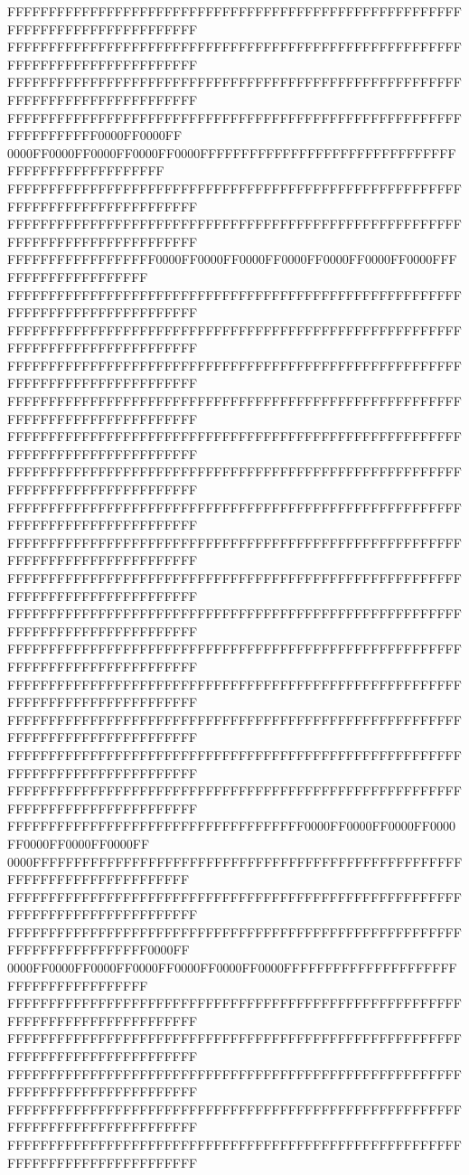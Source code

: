 FFFFFFFFFFFFFFFFFFFFFFFFFFFFFFFFFFFFFFFFFFFFFFFFFFFFFFFFFFFFFFFFFFFFFFFFFFFFFF
FFFFFFFFFFFFFFFFFFFFFFFFFFFFFFFFFFFFFFFFFFFFFFFFFFFFFFFFFFFFFFFFFFFFFFFFFFFFFF
FFFFFFFFFFFFFFFFFFFFFFFFFFFFFFFFFFFFFFFFFFFFFFFFFFFFFFFFFFFFFFFFFFFFFFFFFFFFFF
FFFFFFFFFFFFFFFFFFFFFFFFFFFFFFFFFFFFFFFFFFFFFFFFFFFFFFFFFFFFFFFFFF0000FF0000FF
0000FF0000FF0000FF0000FF0000FFFFFFFFFFFFFFFFFFFFFFFFFFFFFFFFFFFFFFFFFFFFFFFFFF
FFFFFFFFFFFFFFFFFFFFFFFFFFFFFFFFFFFFFFFFFFFFFFFFFFFFFFFFFFFFFFFFFFFFFFFFFFFFFF
FFFFFFFFFFFFFFFFFFFFFFFFFFFFFFFFFFFFFFFFFFFFFFFFFFFFFFFFFFFFFFFFFFFFFFFFFFFFFF
FFFFFFFFFFFFFFFFFF0000FF0000FF0000FF0000FF0000FF0000FF0000FFFFFFFFFFFFFFFFFFFF
FFFFFFFFFFFFFFFFFFFFFFFFFFFFFFFFFFFFFFFFFFFFFFFFFFFFFFFFFFFFFFFFFFFFFFFFFFFFFF
FFFFFFFFFFFFFFFFFFFFFFFFFFFFFFFFFFFFFFFFFFFFFFFFFFFFFFFFFFFFFFFFFFFFFFFFFFFFFF
FFFFFFFFFFFFFFFFFFFFFFFFFFFFFFFFFFFFFFFFFFFFFFFFFFFFFFFFFFFFFFFFFFFFFFFFFFFFFF
FFFFFFFFFFFFFFFFFFFFFFFFFFFFFFFFFFFFFFFFFFFFFFFFFFFFFFFFFFFFFFFFFFFFFFFFFFFFFF
FFFFFFFFFFFFFFFFFFFFFFFFFFFFFFFFFFFFFFFFFFFFFFFFFFFFFFFFFFFFFFFFFFFFFFFFFFFFFF
FFFFFFFFFFFFFFFFFFFFFFFFFFFFFFFFFFFFFFFFFFFFFFFFFFFFFFFFFFFFFFFFFFFFFFFFFFFFFF
FFFFFFFFFFFFFFFFFFFFFFFFFFFFFFFFFFFFFFFFFFFFFFFFFFFFFFFFFFFFFFFFFFFFFFFFFFFFFF
FFFFFFFFFFFFFFFFFFFFFFFFFFFFFFFFFFFFFFFFFFFFFFFFFFFFFFFFFFFFFFFFFFFFFFFFFFFFFF
FFFFFFFFFFFFFFFFFFFFFFFFFFFFFFFFFFFFFFFFFFFFFFFFFFFFFFFFFFFFFFFFFFFFFFFFFFFFFF
FFFFFFFFFFFFFFFFFFFFFFFFFFFFFFFFFFFFFFFFFFFFFFFFFFFFFFFFFFFFFFFFFFFFFFFFFFFFFF
FFFFFFFFFFFFFFFFFFFFFFFFFFFFFFFFFFFFFFFFFFFFFFFFFFFFFFFFFFFFFFFFFFFFFFFFFFFFFF
FFFFFFFFFFFFFFFFFFFFFFFFFFFFFFFFFFFFFFFFFFFFFFFFFFFFFFFFFFFFFFFFFFFFFFFFFFFFFF
FFFFFFFFFFFFFFFFFFFFFFFFFFFFFFFFFFFFFFFFFFFFFFFFFFFFFFFFFFFFFFFFFFFFFFFFFFFFFF
FFFFFFFFFFFFFFFFFFFFFFFFFFFFFFFFFFFFFFFFFFFFFFFFFFFFFFFFFFFFFFFFFFFFFFFFFFFFFF
FFFFFFFFFFFFFFFFFFFFFFFFFFFFFFFFFFFFFFFFFFFFFFFFFFFFFFFFFFFFFFFFFFFFFFFFFFFFFF
FFFFFFFFFFFFFFFFFFFFFFFFFFFFFFFFFFFF0000FF0000FF0000FF0000FF0000FF0000FF0000FF
0000FFFFFFFFFFFFFFFFFFFFFFFFFFFFFFFFFFFFFFFFFFFFFFFFFFFFFFFFFFFFFFFFFFFFFFFFFF
FFFFFFFFFFFFFFFFFFFFFFFFFFFFFFFFFFFFFFFFFFFFFFFFFFFFFFFFFFFFFFFFFFFFFFFFFFFFFF
FFFFFFFFFFFFFFFFFFFFFFFFFFFFFFFFFFFFFFFFFFFFFFFFFFFFFFFFFFFFFFFFFFFFFFFF0000FF
0000FF0000FF0000FF0000FF0000FF0000FF0000FFFFFFFFFFFFFFFFFFFFFFFFFFFFFFFFFFFFFF
FFFFFFFFFFFFFFFFFFFFFFFFFFFFFFFFFFFFFFFFFFFFFFFFFFFFFFFFFFFFFFFFFFFFFFFFFFFFFF
FFFFFFFFFFFFFFFFFFFFFFFFFFFFFFFFFFFFFFFFFFFFFFFFFFFFFFFFFFFFFFFFFFFFFFFFFFFFFF
FFFFFFFFFFFFFFFFFFFFFFFFFFFFFFFFFFFFFFFFFFFFFFFFFFFFFFFFFFFFFFFFFFFFFFFFFFFFFF
FFFFFFFFFFFFFFFFFFFFFFFFFFFFFFFFFFFFFFFFFFFFFFFFFFFFFFFFFFFFFFFFFFFFFFFFFFFFFF
FFFFFFFFFFFFFFFFFFFFFFFFFFFFFFFFFFFFFFFFFFFFFFFFFFFFFFFFFFFFFFFFFFFFFFFFFFFFFF
